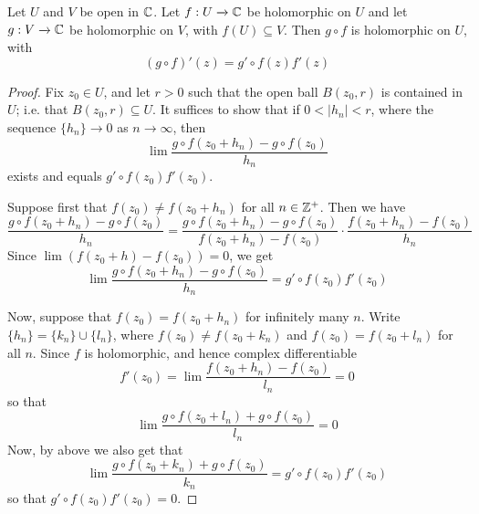 \begin{theorem}\label{3.2.3}
    Let $U$ and  $V$ be open in $\mathbb{C}$. Let $f:U \xrightarrow{} \mathbb{C}$ be holomorphic on
    $U$ and let  $g:V \xrightarrow{} \mathbb{C}$ be holomorphic on $V$, with  $f(U)
    \subseteq V$. Then $g \circ f$ is holomorphic on $U$, with
    \begin{equation*}
        (g \circ f)'(z)=g' \circ f(z)f'(z)
    \end{equation*}
\end{theorem}
\begin{proof}
    Fix $z_0 \in U$, and let $r>0$ such that the open ball $B(z_0,r)$ is
    contained in $U$; i.e. that  $B(z_0,r) \subseteq U$. It suffices to show that
    if $0<|h_n|<r$, where the sequence $\{h_n\} \xrightarrow{} 0$ as $n
    \xrightarrow{} \infty$, then
    \begin{equation*}
        \lim{\frac{g \circ f(z_0+h_n)-g \circ f(z_0)}{h_n}}
    \end{equation*}
    exists and equals $g' \circ f(z_0)f'(z_0)$.

    Suppose first that $f(z_0) \neq f(z_0+h_n)$ for all $n \in \mathbb{Z}^+$. Then we
    have
    \begin{equation*}
        \frac{g \circ f(z_0+h_n)-g \circ f(z_0)}{h_n}=
        \frac{g \circ f(z_0+h_n)-g \circ f(z_0)}{f(z_0+h_n)-f(z_0)} \cdot
        \frac{f(z_0+h_n)-f(z_0)}{h_n}
    \end{equation*}
    Since $\lim{(f(z_0+h)-f(z_0))}=0$, we get
    \begin{equation*}
        \lim{\frac{g \circ f(z_0+h_n)-g \circ f(z_0)}{h_n}}=g' \circ f(z_0)f'(z_0)
    \end{equation*}

    Now, suppose that $f(z_0)=f(z_0+h_n)$ for infinitely many $n$. Write
    $\{h_n\}=\{k_n\} \cup \{l_n\}$, where $f(z_0) \neq f(z_0+k_n)$ and
    $f(z_0)=f(z_0+l_n)$ for all $n$. Since $f$ is holomorphic, and hence complex
    differentiable
    \begin{equation*}
        f'(z_0)=\lim{\frac{f(z_0+h_n)-f(z_0)}{l_n}}=0
    \end{equation*}
    so that
    \begin{equation*}
        \lim{\frac{g \circ f(z_0+l_n)+g \circ f(z_0)}{l_n}}=0
    \end{equation*}
    Now, by above we also get that
    \begin{equation*}
        \lim{\frac{g \circ f(z_0+k_n)+g \circ f(z_0)}{k_n}}=g' \circ f(z_0)f'(z_0)
    \end{equation*}
    so that $g' \circ f(z_0)f'(z_0)=0$.
\end{proof}

